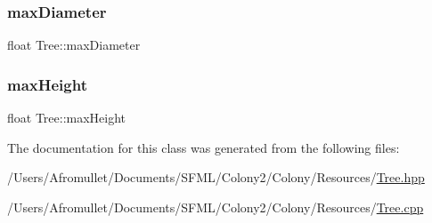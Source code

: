 \subsubsection{\texorpdfstring{max\+Diameter}{maxDiameter}}
{\footnotesize\ttfamily float Tree\+::max\+Diameter\hspace{0.3cm}{\ttfamily [private]}}

\mbox{\label{class_tree_a5bcc9823dd464d77520fbafdc1c8eb44}} 
\subsubsection{\texorpdfstring{max\+Height}{maxHeight}}
{\footnotesize\ttfamily float Tree\+::max\+Height\hspace{0.3cm}{\ttfamily [private]}}



The documentation for this class was generated from the following files\+:\begin{DoxyCompactItemize}
\item 
/\+Users/\+Afromullet/\+Documents/\+S\+F\+M\+L/\+Colony2/\+Colony/\+Resources/\mbox{\hyperlink{_tree_8hpp}{Tree.\+hpp}}\item 
/\+Users/\+Afromullet/\+Documents/\+S\+F\+M\+L/\+Colony2/\+Colony/\+Resources/\mbox{\hyperlink{_tree_8cpp}{Tree.\+cpp}}\end{DoxyCompactItemize}

